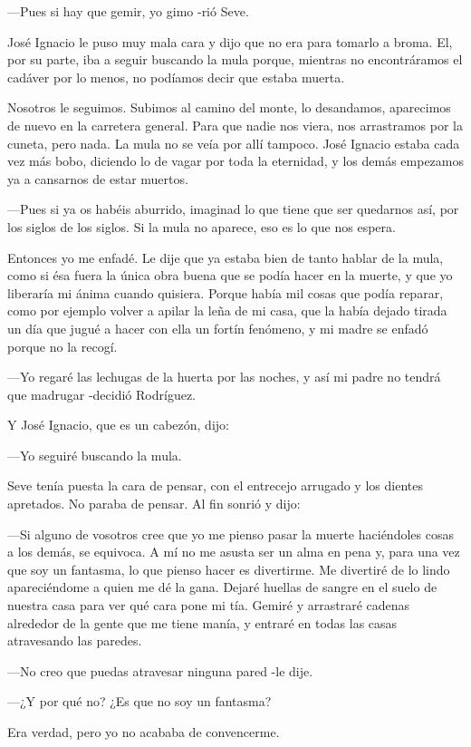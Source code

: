 \documentclass{barcodevapor3pags}
\begin{document}
---Pues si hay que gemir, yo gimo -rió Seve.~

José Ignacio le puso muy mala cara y dijo que no era para tomarlo a
broma. El, por su parte, iba a seguir buscando la mula porque, mientras
no encontráramos el cadáver por lo menos, no podíamos decir que estaba
muerta.~

Nosotros le seguimos. Subimos al camino del monte, lo desandamos,
aparecimos de nuevo en la carretera general. Para que nadie nos viera,
nos arrastramos por la cuneta, pero nada. La mula no se veía por allí
tampoco. José Ignacio estaba cada vez más bobo, diciendo lo de vagar por
toda la eternidad, y los demás empezamos ya a cansarnos de estar
muertos.~

---Pues si ya os habéis aburrido, imaginad lo que tiene que ser
quedarnos así, por los siglos de los siglos. Si la mula no aparece, eso
es lo que nos espera.~

Entonces yo me enfadé. Le dije que ya estaba bien de tanto hablar de la
mula, como si ésa fuera la única obra buena que se podía hacer en la
muerte, y que yo liberaría mi ánima cuando quisiera. Porque había mil
cosas que podía reparar, como por ejemplo volver a apilar la leña de mi
casa, que la había dejado tirada un día que jugué a hacer con ella un
fortín fenómeno, y mi madre se enfadó porque no la recogí.~

---Yo regaré las lechugas de la huerta por las noches, y así mi padre no
tendrá que madrugar -decidió Rodríguez.~

Y José Ignacio, que es un cabezón, dijo:~

---Yo seguiré buscando la mula.~

Seve tenía puesta la cara de pensar, con el entrecejo arrugado y los
dientes apretados. No paraba de pensar. Al fin sonrió y dijo:~

---Si alguno de vosotros cree que yo me pienso pasar la muerte
haciéndoles cosas a los demás, se equivoca. A mí no me asusta ser un
alma en pena y, para una vez que soy un fantasma, lo que pienso hacer es
divertirme. Me divertiré de lo lindo apareciéndome a quien me dé la
gana. Dejaré huellas de sangre en el suelo de nuestra casa para ver qué
cara pone mi tía. Gemiré y arrastraré cadenas alrededor de la gente que
me tiene manía, y entraré en todas las casas atravesando las paredes.~

---No creo que puedas atravesar ninguna pared -le dije.~

---¿Y por qué no? ¿Es que no soy un fantasma?~

Era verdad, pero yo no acababa de convencerme.~
\end{document}
